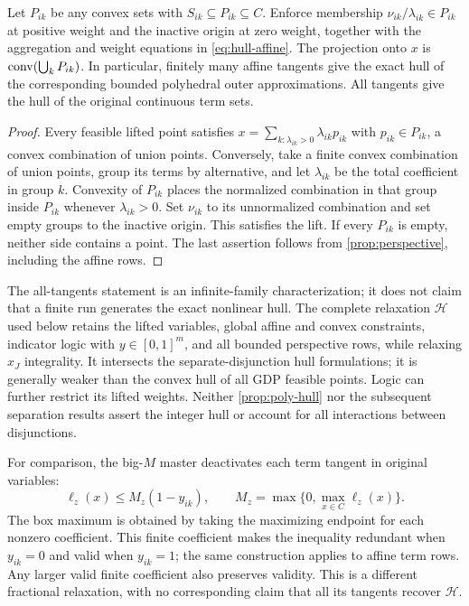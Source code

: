 \begin{proposition}\label{prop:poly-hull}
Let $P_{ik}$ be any convex sets with $S_{ik}\subseteq P_{ik}\subseteq C$. Enforce membership $\nu_{ik}/\lambda_{ik}\in P_{ik}$ at positive weight and the inactive origin at zero weight, together with the aggregation and weight equations in \eqref{eq:hull-affine}. The projection onto $x$ is $\operatorname{conv}(\bigcup_kP_{ik})$. In particular, finitely many affine tangents give the exact hull of the corresponding bounded polyhedral outer approximations. All tangents give the hull of the original continuous term sets.
\end{proposition}
\begin{proof}
Every feasible lifted point satisfies $x=\sum_{k:\lambda_{ik}>0}\lambda_{ik}p_{ik}$ with $p_{ik}\in P_{ik}$, a convex combination of union points. Conversely, take a finite convex combination of union points, group its terms by alternative, and let $\lambda_{ik}$ be the total coefficient in group $k$. Convexity of $P_{ik}$ places the normalized combination in that group inside $P_{ik}$ whenever $\lambda_{ik}>0$. Set $\nu_{ik}$ to its unnormalized combination and set empty groups to the inactive origin. This satisfies the lift. If every $P_{ik}$ is empty, neither side contains a point. The last assertion follows from \cref{prop:perspective}, including the affine rows.
\end{proof}
The all-tangents statement is an infinite-family characterization; it does not claim that a finite run generates the exact nonlinear hull. The complete relaxation $\mathcal H$ used below retains the lifted variables, global affine and convex constraints, indicator logic with $y\in[0,1]^m$, and all bounded perspective rows, while relaxing $x_J$ integrality. It intersects the separate-disjunction hull formulations; it is generally weaker than the convex hull of all GDP feasible points. Logic can further restrict its lifted weights. Neither \cref{prop:poly-hull} nor the subsequent separation results assert the integer hull or account for all interactions between disjunctions.

For comparison, the big-$M$ master deactivates each term tangent in original variables:
\begin{equation}\label{eq:bigm-cut}
 \ell_z(x)\le M_z(1-y_{ik}),\qquad
 M_z=\max\{0,\max_{x\in C}\ell_z(x)\}.
\end{equation}
The box maximum is obtained by taking the maximizing endpoint for each nonzero coefficient. This finite coefficient makes the inequality redundant when $y_{ik}=0$ and valid when $y_{ik}=1$; the same construction applies to affine term rows. Any larger valid finite coefficient also preserves validity. This is a different fractional relaxation, with no corresponding claim that all its tangents recover $\mathcal H$.

